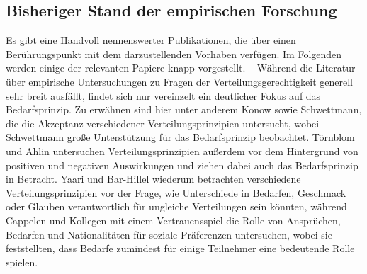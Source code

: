 \documentclass[a4paper]{thesis}
\begin{document}
\subsection{Bisheriger Stand der empirischen Forschung}
Es gibt eine Handvoll nennenswerter Publikationen, die über einen Berührungspunkt mit dem darzustellenden Vorhaben verfügen. Im Folgenden werden einige der relevanten Papiere knapp vorgestellt. -- Während die Literatur über empirische Untersuchungen zu Fragen der Verteilungsgerechtigkeit generell sehr breit ausfällt, findet sich nur vereinzelt ein deutlicher Fokus auf das Bedarfsprinzip. Zu erwähnen sind hier unter anderem Konow sowie Schwettmann, die die Akzeptanz verschiedener Verteilungsprinzipien untersucht, wobei Schwettmann große Unterstützung für das Bedarfsprinzip beobachtet. Törnblom und Ahlin untersuchen Verteilungsprinzipien außerdem vor dem Hintergrund von positiven und negativen Auswirkungen und ziehen dabei auch das Bedarfsprinzip in Betracht. Yaari und Bar-Hillel wiederum betrachten verschiedene Verteilungsprinzipien vor der Frage, wie Unterschiede in Bedarfen, Geschmack oder Glauben verantwortlich für ungleiche Verteilungen sein könnten, während Cappelen und Kollegen mit einem Vertrauensspiel die Rolle von Ansprüchen, Bedarfen und Nationalitäten für soziale Präferenzen untersuchen, wobei sie feststellten, dass Bedarfe zumindest für einige Teilnehmer eine bedeutende Rolle spielen.
\end{document}
